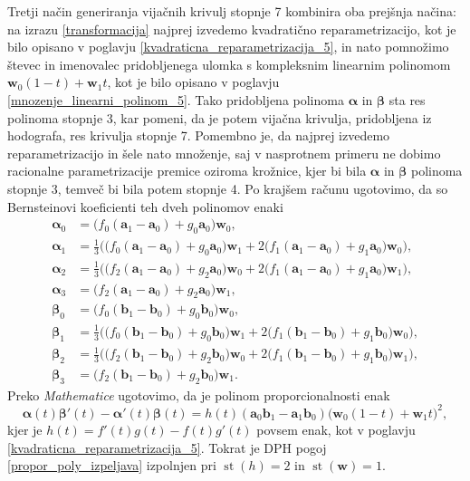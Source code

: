 \documentclass[12pt,a4paper,twoside]{article}
\theoremstyle{definition} %
\theoremstyle{plain} %
\theoremstyle{primerstyle}
\numberwithin{equation}{section}  %
\newcommand{\aV}{\mathbf{a}}
\newcommand{\bV}{\mathbf{b}}
\newcommand{\wV}{\mathbf{w}}
\newcommand{\balpha}{\boldsymbol \alpha}
\newcommand{\bbeta}{\boldsymbol \beta}
\DeclareMathOperator{\st}{st}
\begin{document}
Tretji način generiranja vijačnih krivulj stopnje 7 kombinira oba prejšnja načina: na izrazu \eqref{transformacija} najprej izvedemo kvadratično reparametrizacijo, kot je bilo opisano v poglavju \ref{kvadraticna_reparametrizacija_5}, in nato pomnožimo števec in imenovalec pridobljenega ulomka s kompleksnim linearnim polinomom $\wV_0(1-t)+\wV_1t$, kot je bilo opisano v poglavju \ref{mnozenje_linearni_polinom_5}. Tako pridobljena polinoma $\balpha$ in $\bbeta$ sta res polinoma stopnje 3, kar pomeni, da je potem vijačna krivulja, pridobljena iz hodografa, res krivulja stopnje 7. Pomembno je, da najprej izvedemo reparametrizacijo in šele nato množenje, saj v nasprotnem primeru ne dobimo racionalne parametrizacije premice oziroma krožnice, kjer bi bila $\balpha$ in $\bbeta$ polinoma stopnje 3, temveč bi bila potem stopnje 4. Po krajšem računu ugotovimo, da so Bernsteinovi koeficienti teh dveh polinomov enaki
\begin{align}
	\balpha_0&=\big(f_0(\aV_1-\aV_0)+g_0\aV_0\big)\wV_0,\nonumber\\
	\balpha_1&=\frac{1}{3}\Big(\big(f_0(\aV_1-\aV_0)+g_0\aV_0\big)\wV_1+2\big(f_1(\aV_1-\aV_0)+g_1\aV_0\big)\wV_0\Big),\nonumber\\
	\balpha_2&=\frac{1}{3}\Big(\big(f_2(\aV_1-\aV_0)+g_2\aV_0\big)\wV_0+2\big(f_1(\aV_1-\aV_0)+g_1\aV_0\big)\wV_1\Big),\nonumber\\
	\balpha_3&=\big(f_2(\aV_1-\aV_0)+g_2\aV_0\big)\wV_1,\label{mnozenje_repara_7_koef}\\
	\bbeta_0&=\big(f_0(\bV_1-\bV_0)+g_0\bV_0\big)\wV_0,\nonumber\\
	\bbeta_1&=\frac{1}{3}\Big(\big(f_0(\bV_1-\bV_0)+g_0\bV_0\big)\wV_1+2\big(f_1(\bV_1-\bV_0)+g_1\bV_0\big)\wV_0\Big),\nonumber\\
	\bbeta_2&=\frac{1}{3}\Big(\big(f_2(\bV_1-\bV_0)+g_2\bV_0\big)\wV_0+2\big(f_1(\bV_1-\bV_0)+g_1\bV_0\big)\wV_1\Big),\nonumber\\
	\bbeta_3&=\big(f_2(\bV_1-\bV_0)+g_2\bV_0\big)\wV_1.\nonumber
\end{align}
Preko \emph{Mathematice} ugotovimo, da je polinom proporcionalnosti enak
\begin{equation*}
	\balpha(t)\bbeta'(t)-\balpha'(t)\bbeta(t)=h(t)(\aV_0\bV_1-\aV_1\bV_0)\big(\wV_0(1-t)+\wV_1t\big)^2,
\end{equation*}
kjer je $h(t)=f'(t)g(t)-f(t)g'(t)$ povsem enak, kot v poglavju \ref{kvadraticna_reparametrizacija_5}. Tokrat je DPH pogoj \eqref{propor_poly_izpeljava} izpolnjen pri $\st(h)=2$ in $\st(\wV)=1.$
\end{document}
